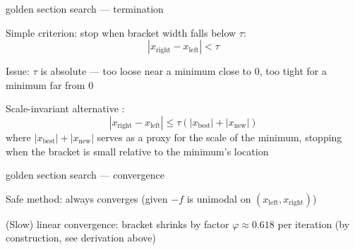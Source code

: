 \documentclass[11pt,compress,t,notes=noshow, xcolor=table]{beamer}
\newcommand{\xleft}{x_{\text{left}}}
\newcommand{\xright}{x_{\text{right}}}
\newcommand{\xnew}{x_{\text{new}}}
\newcommand{\xbest}{x_{\text{best}}}
\begin{document}
\begin{framei}[sep=L]{golden section search --- termination}
\item Simple criterion: stop when bracket width falls below $\tau$:
$$|\xright - \xleft| < \tau$$
\item Issue: $\tau$ is absolute --- too loose near a minimum close to $0$, too tight for a minimum far from $0$
\item Scale-invariant alternative :
$$|\xright - \xleft| \leq \tau (|\xbest| + |\xnew|)$$
where $|\xbest| + |\xnew|$ serves as a proxy for the scale of the minimum, stopping when the bracket is small relative to the minimum's location
\end{framei}


\begin{framei}[sep=L]{golden section search --- convergence}
\item Safe method: always converges (given $-f$ is unimodal on $(\xleft, \xright)$)
\item (Slow) linear convergence: bracket shrinks by factor $\varphi \approx 0.618$ per iteration (by construction, see derivation above)
\end{framei}

\endlecture
\end{document}
